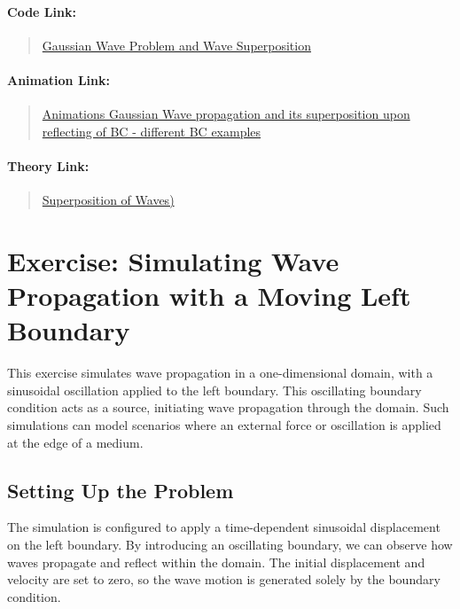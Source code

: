 \documentclass{article}
\begin{document}
		
		\paragraph{Code Link:}
		\begin{quote}
			\href{https://github.com/pb96git/Numerical-Solutions-for-Partial-Differential-Equations/blob/main/Part_2_WaveEquation/Example_Codes/Gaussian.py}{Gaussian Wave Problem and Wave Superposition}
		\end{quote}
		
		\paragraph{Animation Link:}
		\begin{quote}
			\href{https://github.com/pb96git/Numerical-Solutions-for-Partial-Differential-Equations/tree/main/Part_2_WaveEquation/Animations_postProcessing/gaussian_wave_all_BC}{Animations Gaussian Wave propagation and its superposition upon reflecting of BC - different BC examples}
		\end{quote}
		
		\paragraph{Theory Link:}
		\begin{quote}
			\href{https://www.acs.psu.edu/drussell/Demos/superposition/superposition.html}{Superposition of Waves)}
		\end{quote}
	
	
		\section{Exercise: Simulating Wave Propagation with a Moving Left Boundary}
		
			This exercise simulates wave propagation in a one-dimensional domain, with a sinusoidal oscillation applied to the left boundary. This oscillating boundary condition acts as a source, initiating wave propagation through the domain. Such simulations can model scenarios where an external force or oscillation is applied at the edge of a medium.
			
			\subsection{Setting Up the Problem}
			
			The simulation is configured to apply a time-dependent sinusoidal displacement on the left boundary. By introducing an oscillating boundary, we can observe how waves propagate and reflect within the domain. The initial displacement and velocity are set to zero, so the wave motion is generated solely by the boundary condition.
			
\end{document}
